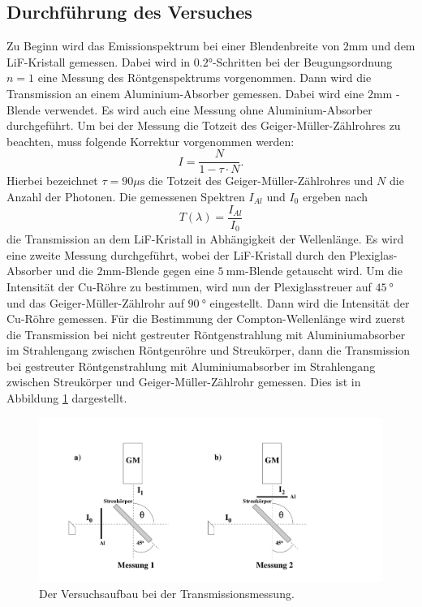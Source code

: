 \subsection{Durchführung des Versuches}
Zu Beginn wird das Emissionspektrum bei einer Blendenbreite von $2 \si{\milli\meter}$ und dem LiF-Kristall gemessen. Dabei wird in $0.2 \si{\degree}$-Schritten bei der Beugungsordnung $n = 1$ eine Messung des
Röntgenspektrums vorgenommen. Dann wird die Transmission an einem Aluminium-Absorber gemessen. Dabei wird eine $2 \si{\milli\meter}$ -Blende verwendet. Es wird auch eine Messung ohne Aluminium-Absorber
durchgeführt.
Um bei der Messung die Totzeit des Geiger-Müller-Zählrohres zu beachten, muss folgende Korrektur vorgenommen werden:
\begin{equation*}
	I = \frac{N}{1 - \tau \cdot N}.
\end{equation*}
Hierbei bezeichnet $\tau = 90 \mu \si{\second}$ die Totzeit des Geiger-Müller-Zählrohres und $N$ die Anzahl der Photonen.
Die gemessenen Spektren $I_{Al}$ und $I_0$ ergeben nach
\begin{equation}
	T(\lambda) = \frac{I_{Al}}{I_0}
	\label{eqn:trans}
\end{equation}
die Transmission an dem LiF-Kristall in Abhängigkeit der Wellenlänge.
Es wird eine zweite Messung durchgeführt, wobei der LiF-Kristall durch den Plexiglas-Absorber und die $2 \si{\milli\meter}$-Blende gegen eine $\SI{5}{\milli\meter}$-Blende getauscht wird.
Um die Intensität der Cu-Röhre zu bestimmen, wird nun der Plexiglasstreuer auf $\SI{45}{\degree}$ und das Geiger-Müller-Zählrohr auf $\SI{90}{\degree}$ eingestellt. Dann wird die Intensität der Cu-Röhre gemessen.
Für die Bestimmung der Compton-Wellenlänge wird zuerst die Transmission bei nicht gestreuter Röntgenstrahlung mit Aluminiumabsorber im Strahlengang zwischen Röntgenröhre und Streukörper,
dann die Transmission bei gestreuter Röntgenstrahlung mit Aluminiumabsorber im Strahlengang zwischen Streukörper und Geiger-Müller-Zählrohr gemessen.
Dies ist in Abbildung \ref{fig:versuchsaufbau2} dargestellt.

\begin{figure}[H]
  \centering
  \includegraphics[scale=0.2]{content/versuchsaufbau2.png}
  \caption{Der Versuchsaufbau bei der Transmissionsmessung.}
  \label{fig:versuchsaufbau2}
\end{figure}
